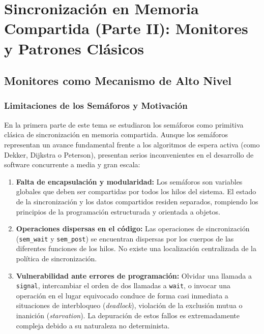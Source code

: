 \chapter{Sincronización en Memoria Compartida (Parte II): Monitores y Patrones Clásicos}
\label{cap:tema2_parte2}


\section{Monitores como Mecanismo de Alto Nivel}

\subsection{Limitaciones de los Semáforos y Motivación}
En la primera parte de este tema se estudiaron los semáforos como primitiva clásica de sincronización en memoria compartida. Aunque los semáforos representan un avance fundamental frente a los algoritmos de espera activa (como Dekker, Dijkstra o Peterson), presentan serios inconvenientes en el desarrollo de software concurrente a media y gran escala:

\begin{enumerate}[leftmargin=*]
    \item \textbf{Falta de encapsulación y modularidad:} Los semáforos son variables globales que deben ser compartidas por todos los hilos del sistema. El estado de la sincronización y los datos compartidos residen separados, rompiendo los principios de la programación estructurada y orientada a objetos.
    \item \textbf{Operaciones dispersas en el código:} Las operaciones de sincronización (\texttt{sem\_wait} y \texttt{sem\_post}) se encuentran dispersas por los cuerpos de las diferentes funciones de los hilos. No existe una localización centralizada de la política de sincronización.
    \item \textbf{Vulnerabilidad ante errores de programación:} Olvidar una llamada a \texttt{signal}, intercambiar el orden de dos llamadas a \texttt{wait}, o invocar una operación en el lugar equivocado conduce de forma casi inmediata a situaciones de interbloqueo (\emph{deadlock}), violación de la exclusión mutua o inanición (\emph{starvation}). La depuración de estos fallos es extremadamente compleja debido a su naturaleza no determinista.
\end{enumerate}

